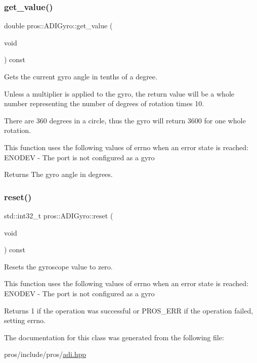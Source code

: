 \subsubsection{\texorpdfstring{get\+\_\+value()}{get\_value()}}
{\footnotesize\ttfamily double pros\+::\+A\+D\+I\+Gyro\+::get\+\_\+value (\begin{DoxyParamCaption}\item[{void}]{ }\end{DoxyParamCaption}) const}



Gets the current gyro angle in tenths of a degree. 

Unless a multiplier is applied to the gyro, the return value will be a whole number representing the number of degrees of rotation times 10.

There are 360 degrees in a circle, thus the gyro will return 3600 for one whole rotation.

This function uses the following values of errno when an error state is reached\+: E\+N\+O\+D\+EV -\/ The port is not configured as a gyro

\begin{DoxyReturn}{Returns}
The gyro angle in degrees. 
\end{DoxyReturn}
\mbox{\label{classpros_1_1ADIGyro_a3e2df8c21f4eb0bfa3559834221195fe}} 
\subsubsection{\texorpdfstring{reset()}{reset()}}
{\footnotesize\ttfamily std\+::int32\+\_\+t pros\+::\+A\+D\+I\+Gyro\+::reset (\begin{DoxyParamCaption}\item[{void}]{ }\end{DoxyParamCaption}) const}



Resets the gyroscope value to zero. 

This function uses the following values of errno when an error state is reached\+: E\+N\+O\+D\+EV -\/ The port is not configured as a gyro

\begin{DoxyReturn}{Returns}
1 if the operation was successful or P\+R\+O\+S\+\_\+\+E\+RR if the operation failed, setting errno. 
\end{DoxyReturn}


The documentation for this class was generated from the following file\+:\begin{DoxyCompactItemize}
\item 
pros/include/pros/\hyperlink{adi_8hpp}{adi.\+hpp}\end{DoxyCompactItemize}
